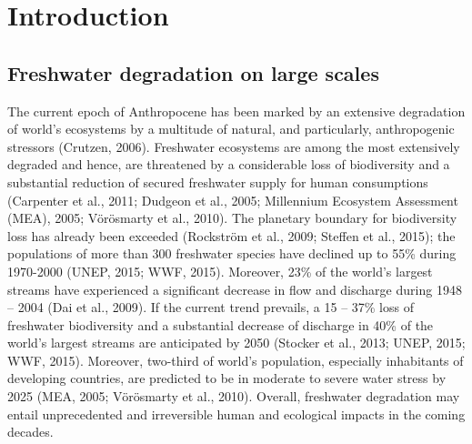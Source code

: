 \chapter{Introduction}
\label{Introduction}

\section{Freshwater degradation on large scales}
\label{Freshwater degradation on large scales}

The current epoch of Anthropocene has been marked by an extensive degradation of world's ecosystems by a multitude of natural, and particularly, anthropogenic stressors (Crutzen, 2006). Freshwater ecosystems are among the most extensively degraded and hence, are threatened by a considerable loss of biodiversity and a substantial reduction of secured freshwater supply for human consumptions (Carpenter et al., 2011; Dudgeon et al., 2005; Millennium Ecosystem Assessment (MEA), 2005; Vörösmarty et al., 2010). The planetary boundary for biodiversity loss has already been exceeded (Rockström et al., 2009; Steffen et al., 2015); the populations of more than 300 freshwater species have declined up to 55\% during 1970-2000 (UNEP, 2015; WWF, 2015). Moreover, 23\% of the world's largest streams have experienced a significant decrease in flow and discharge during 1948 – 2004 (Dai et al., 2009). If the current trend prevails, a 15 – 37\% loss of freshwater biodiversity and a substantial decrease of discharge in 40\% of the world's largest streams are anticipated by 2050 (Stocker et al., 2013; UNEP, 2015; WWF, 2015). Moreover, two-third of world's population, especially inhabitants of developing countries, are predicted to be in moderate to severe water stress by 2025 (MEA, 2005; Vörösmarty et al., 2010). Overall, freshwater degradation may entail unprecedented and irreversible human and ecological impacts in the coming decades.


